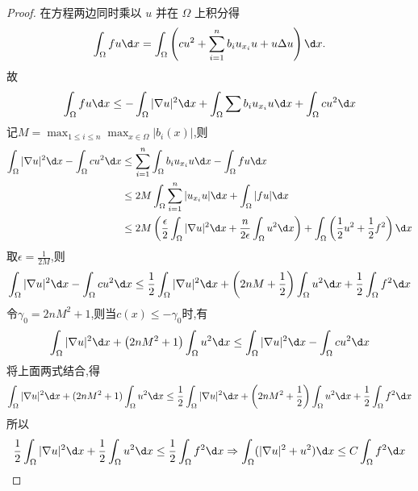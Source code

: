 \begin{proof}
  在方程两边同时乘以 $u$ 并在 $\Omega$ 上积分得
  \[\int_{\Omega}fu\d x 
    = \int_{\Omega}\left(cu^2+\sum_{i=1}^nb_iu_{x_i}u+u\Delta u\right)\d x.\]
  故
  \[\int_{\Omega}fu\d x\leq-\int_{\Omega}|\nabla u|^2\d x+\int_{\Omega}\sum b_iu_{x_i}u\d x+\int_{\Omega}cu^2\d x\]
  记$M=\max_{1\leq i\leq n}\max_{x\in\Omega}|b_i(x)|$,则
  \[\begin{split}
  \int_{\Omega}|\nabla u|^2\d x-\int_{\Omega}cu^2\d x
  &\leq\sum_{i=1}^n\int_{\Omega}b_iu_{x_i}u\d x-\int_{\Omega}fu\d x\\
  &\leq2M\int_{\Omega}\sum_{i=1}^n|u_{x_i}u|\d x+\int_{\Omega}|fu|\d x\\
  &\leq2M\left(\frac{\epsilon}{2}\int_{\Omega}|\nabla u|^2\d x+\frac{n}{2\epsilon}\int_{\Omega}u^2\d x\right)+\int_{\Omega}\left(\frac{1}{2}u^2+\frac{1}{2}f^2\right)\d x
  \end{split}\]
  取$\epsilon=\frac{1}{2M}$,则
  \[\int_{\Omega}|\nabla u|^2\d x-\int_{\Omega}cu^2\d x\leq\frac{1}{2}\int_{\Omega}|\nabla u|^2\d x+\left(2nM+\frac{1}{2}\right)\int_{\Omega}u^2\d x+\frac{1}{2}\int_{\Omega}f^2\d x\]
  令$\gamma_0=2nM^2+1$,则当$c(x)\leq-\gamma_0$时,有
  \[\int_{\Omega}|\nabla u|^2\d x+\left(2nM^2+1\right)\int_{\Omega}u^2\d x\leq\int_{\Omega}|\nabla u|^2\d x-\int_{\Omega}cu^2\d x\]
  将上面两式结合,得
  \[\int_{\Omega}|\nabla u|^2\d x+(2nM^2+1)\int_{\Omega}u^2\d x\leq\frac{1}{2}\int_{\Omega}|\nabla u|^2\d x+\left(2nM^2+\frac{1}{2}\right)\int_{\Omega}u^2\d x+\frac{1}{2}\int_{\Omega}f^2\d x\]
  所以
  \[\frac{1}{2}\int_{\Omega}|\nabla u|^2\d x+\frac{1}{2}\int_{\Omega}u^2\d x\leq\frac{1}{2}\int_{\Omega}f^2\d x\Rightarrow\int_{\Omega}(|\nabla u|^2+u^2)\d x\leq C\int_{\Omega}f^2\d x\]
\end{proof}